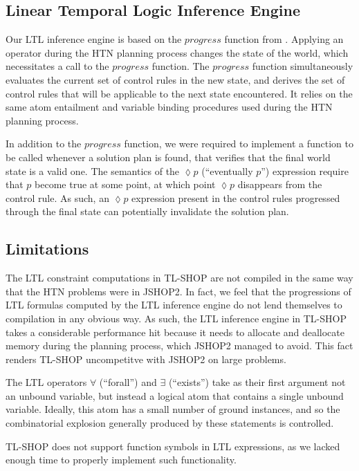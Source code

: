 \documentclass[12pt]{article}
\begin{document}
\subsection{Linear Temporal Logic Inference Engine}
Our LTL inference engine is based on the $progress$ function from 
\cite{nau2004apt}. Applying an operator during the HTN planning process changes 
the state of the world, which necessitates a call to the $progress$ function. 
The $progress$ function simultaneously evaluates the current set of control 
rules in the new state, and derives the set of control rules that will be 
applicable to the next state encountered. It relies on the same atom entailment 
and variable binding procedures used during the HTN planning process.

In addition to the $progress$ function, we were required to implement a 
function to be called whenever a solution plan is found, that verifies that the 
final world state is a valid one. The semantics of the $\lozenge p$ 
(``eventually $p$'') expression require that $p$ become true at some point, at 
which point $\lozenge p$ disappears from the control rule. As such, an 
$\lozenge p$ expression present in the control rules progressed through the 
final state can potentially invalidate the solution plan.

\subsection{Limitations} 
The LTL constraint computations in TL-SHOP are not compiled in the same way 
that the HTN problems were in JSHOP2. In fact, we feel that the progressions of 
LTL formulas computed by the LTL inference engine do not lend themselves to 
compilation in any obvious way. As such, the LTL inference engine in TL-SHOP 
takes a considerable performance hit because it needs to allocate and 
deallocate memory during the planning process, which JSHOP2 managed to avoid.
This fact renders TL-SHOP uncompetitve with JSHOP2 on large problems.

The LTL operators $\forall$ (``forall'') and $\exists$ (``exists'') take as 
their first argument not an unbound variable, but instead a logical atom that 
contains a single unbound variable. Ideally, this atom has a small number of 
ground instances, and so the combinatorial explosion generally produced by 
these statements is controlled.

TL-SHOP does not support function symbols in LTL expressions, as we lacked 
enough time to properly implement such functionality.
\end{document}
